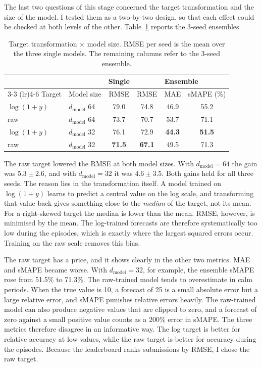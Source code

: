 \documentclass[a4, 12pt]{article}
\begin{document}
The last two questions of this stage concerned the target transformation and the size of the model. I tested them as a two-by-two design, so that each effect could be checked at both levels of the other. Table~\ref{tab:twobytwo} reports the 3-seed ensembles.

\begin{table}[h]
\centering
\small
\setlength{\tabcolsep}{5pt} %
\caption{Target transformation $\times$ model size. RMSE per seed is the mean over the three single models. The remaining columns refer to the 3-seed ensemble.}
\label{tab:twobytwo}
\begin{tabular}{llcccc}
\toprule
& & Single & \multicolumn{3}{c}{Ensemble} \\
\cmidrule(lr){3-3} \cmidrule(lr){4-6}
Target & Model size & RMSE & RMSE & MAE & sMAPE (\%) \\
\midrule
$\log(1+y)$ & $d_{\text{model}}$ 64 & 79.0 & 74.8 & 46.9 & 55.2 \\
raw         & $d_{\text{model}}$ 64 & 73.7 & 70.7 & 53.7 & 71.1 \\
$\log(1+y)$ & $d_{\text{model}}$ 32 & 76.1 & 72.9 & \textbf{44.3} & \textbf{51.5} \\
raw         & $d_{\text{model}}$ 32 & \textbf{71.5} & \textbf{67.1} & 49.5 & 71.3 \\
\bottomrule
\end{tabular}
\end{table}
The raw target lowered the RMSE at both model sizes. With $d_{\text{model}} = 64$ the gain was $5.3 \pm 2.6$, and with $d_{\text{model}} = 32$ it was $4.6 \pm 3.5$. Both gains held for all three seeds. The reason lies in the transformation itself. A model trained on $\log(1+y)$ learns to predict a central value on the log scale, and transforming that value back gives something close to the \emph{median} of the target, not its mean. For a right-skewed target the median is lower than the mean. RMSE, however, is minimised by the mean. The log-trained forecasts are therefore systematically too low during the episodes, which is exactly where the largest squared errors occur. Training on the raw scale removes this bias.

The raw target has a price, and it shows clearly in the other two metrics. MAE and sMAPE became worse. With $d_{\text{model}} = 32$, for example, the ensemble sMAPE rose from 51.5\% to 71.3\%. The raw-trained model tends to overestimate in calm periods. When the true value is 10, a forecast of 25 is a small absolute error but a large relative error, and sMAPE punishes relative errors heavily. The raw-trained model can also produce negative values that are clipped to zero, and a forecast of zero against a small positive value counts as a 200\% error in sMAPE. The three metrics therefore disagree in an informative way. The log target is better for relative accuracy at low values, while the raw target is better for accuracy during the episodes. Because the leaderboard ranks submissions by RMSE, I chose the raw target.
\end{document}
